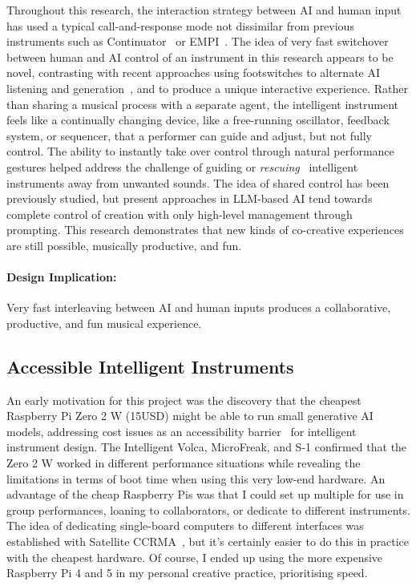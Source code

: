 \documentclass[sigconf]{nimeart}
\begin{document}
Throughout this research, the interaction strategy between AI and human input has used a typical call-and-response mode not dissimilar from previous instruments such as Continuator~\cite{Pachet:2003wd} or EMPI~\cite{martin_empi}. The idea of very fast switchover between human and AI control of an instrument in this research appears to be novel, contrasting with recent approaches using footswitches to alternate AI listening and generation~\cite{living_looper_shepardson}, and to produce a unique interactive experience. 
Rather than sharing a musical process with a separate agent, the intelligent instrument feels like a continually changing device, like a free-running oscillator, feedback system, or sequencer, that a performer can guide and adjust, but not fully control.
The ability to instantly take over control through natural performance gestures helped address the challenge of guiding or \emph{rescuing}~\cite{stefansdottir_intelligent_2025} intelligent instruments away from unwanted sounds.
The idea of shared control has been previously studied, but present approaches in LLM-based AI tend towards complete control of creation with only high-level management through prompting.
This research demonstrates that new kinds of co-creative experiences are still possible, musically productive, and fun.

\paragraph{Design Implication:}
Very fast interleaving between AI and human inputs produces a collaborative, productive, and fun musical experience.

\subsection{Accessible Intelligent Instruments}

An early motivation for this project was the discovery that the cheapest Raspberry Pi Zero 2 W (15USD) might be able to run small generative AI models, addressing cost issues as an accessibility barrier~\cite{longevity-of-bespoke} for intelligent instrument design. The Intelligent Volca, MicroFreak, and S-1 confirmed that the Zero 2 W worked in different performance situations while revealing the limitations in terms of boot time when using this very low-end hardware. An advantage of the cheap Raspberry Pis was that I could set up multiple for use in group performances, loaning to collaborators, or dedicate to different instruments. 
The idea of dedicating single-board computers to different interfaces was established with Satellite CCRMA~\cite{satelliteCCRMA2011}, but it's certainly easier to do this in practice with the cheapest hardware. Of course, I ended up using the more expensive Raspberry Pi 4 and 5 in my personal creative practice, prioritising speed.
\end{document}
